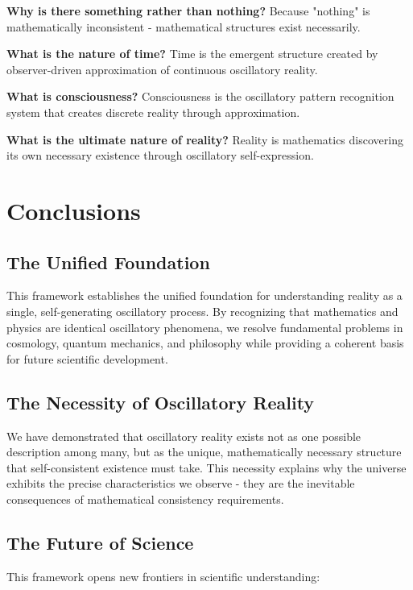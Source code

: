 \documentclass[11pt]{article}
\theoremstyle{remark}
\begin{document}
\textbf{Why is there something rather than nothing?} Because "nothing" is mathematically inconsistent - mathematical structures exist necessarily.

\textbf{What is the nature of time?} Time is the emergent structure created by observer-driven approximation of continuous oscillatory reality.

\textbf{What is consciousness?} Consciousness is the oscillatory pattern recognition system that creates discrete reality through approximation.

\textbf{What is the ultimate nature of reality?} Reality is mathematics discovering its own necessary existence through oscillatory self-expression.

\section{Conclusions}

\subsection{The Unified Foundation}

This framework establishes the unified foundation for understanding reality as a single, self-generating oscillatory process. By recognizing that mathematics and physics are identical oscillatory phenomena, we resolve fundamental problems in cosmology, quantum mechanics, and philosophy while providing a coherent basis for future scientific development.

\subsection{The Necessity of Oscillatory Reality}

We have demonstrated that oscillatory reality exists not as one possible description among many, but as the unique, mathematically necessary structure that self-consistent existence must take. This necessity explains why the universe exhibits the precise characteristics we observe - they are the inevitable consequences of mathematical consistency requirements.

\subsection{The Future of Science}

This framework opens new frontiers in scientific understanding:
\end{document}
